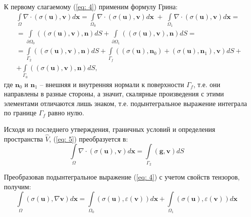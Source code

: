 \documentclass[a4paper, 14pt]{extreport}
\begin{document}
К первому слагаемому (\ref{eq: 4}) применим формулу Грина:
\begin{equation}
	\label{eq: 5}
	\begin{aligned}
		& \int\limits_\Omega{\nabla\!\cdot\!(\sigma(\textbf{u}), \textbf{v})}d\textbf{x} = 
		\int\limits_{\Omega_0}{\nabla\!\cdot\!(\sigma(\textbf{u}), \textbf{v})}d\textbf{x} \; +  \;
		\int\limits_{\Omega_1}{\nabla\!\cdot\!(\sigma(\textbf{u}), \textbf{v})}d\textbf{x} = \\
		& = \int\limits_{\partial\Omega_0}{((\sigma(\textbf{u}), \textbf{v}), \textbf{n})}dS + 
		\int\limits_{\partial\Omega_1}{((\sigma(\textbf{u}), \textbf{v}), \textbf{n})}dS = \\
		& = \int\limits_{\Gamma_2}{((\sigma(\textbf{u}), \textbf{v}), \textbf{n})}dS + 
		\int\limits_{\Gamma_f}{((\sigma(\textbf{u}), \textbf{n}_0) + (\sigma(\textbf{u}), \textbf{n}_1), \textbf{v})}dS + \\
		& + \int\limits_{\Gamma_0}{((\sigma(\textbf{u}), \textbf{v}), \textbf{n})}dS,
	\end{aligned}
\end{equation}
где $\textbf{n}_0$ и $\textbf{n}_1$ -- внешняя и внутренняя нормали к поверхности $\Gamma_f$,
т.е. они направлены в разные стороны, а значит, скалярные произведения с этими элементами 
отличаются лишь знаком, т.е. подынтегральное выражение интеграла по границе $\Gamma_f$ 
равно нулю.

Исходя из последнего утверждения, граничных условий и определения пространства $\hat{V}$,
(\ref{eq: 5}) преобразуется в:
\begin{equation}
	\label{eq: 6}
	\int\limits_\Omega{\nabla\!\cdot\!(\sigma(\textbf{u}), \textbf{v})}d\textbf{x} = 
	\int\limits_{\Gamma_2}{(\textbf{g}, \textbf{v})}dS
\end{equation}

Преобразовав подынтегральное выражение (\ref{eq: 4}) с учетом свойств тензоров, получим:
\begin{equation}
	\label{eq: 7}
	\int\limits_\Omega{(\sigma(\textbf{u}), \nabla \textbf{v})}d\textbf{x} = 
	\int\limits_{\Omega_0}{(\sigma(\textbf{u}), \varepsilon(\textbf{v}))}d\textbf{x} + 
	\int\limits_{\Omega_1}{(\sigma(\textbf{u}), \varepsilon(\textbf{v}))}d\textbf{x}
\end{equation}
\end{document}
